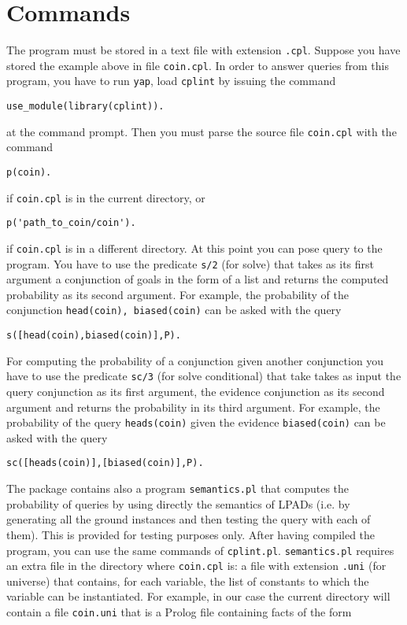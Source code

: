 \documentclass{article}
\begin{document}
\section{Commands}
The program must be stored in a text file with extension \texttt{.cpl}. Suppose you have stored the example above in file \texttt{coin.cpl}. 
In order to answer queries from this program, you have to run \texttt{yap},
load \texttt{cplint} by issuing the command
\begin{verbatim}
use_module(library(cplint)).
\end{verbatim}
at the command prompt.
Then you must parse the source file \texttt{coin.cpl}  with the command
\begin{verbatim}
p(coin).
\end{verbatim}
if \texttt{coin.cpl} is in the current directory, or 
\begin{verbatim}
p('path_to_coin/coin').
\end{verbatim}
if \texttt{coin.cpl} is in a different directory.
At this point you can pose query to the program. You have to use the predicate \texttt{s/2} (for solve) that takes as its first argument a conjunction of goals in the form of a list and returns the computed probability as its second argument. For example, the probability of the conjunction \texttt{head(coin), biased(coin)} can be asked with the query
\begin{verbatim}
s([head(coin),biased(coin)],P).
\end{verbatim}
For computing the probability of a conjunction given another conjunction you have to use the predicate \texttt{sc/3} (for solve conditional) that take takes as input the query conjunction as its first argument, the evidence conjunction as its second argument and returns the probability in its third argument.
For example, the probability of  the query \texttt{heads(coin)} given the evidence \texttt{biased(coin)} can be asked with the query
\begin{verbatim}
sc([heads(coin)],[biased(coin)],P).
\end{verbatim}
The package contains also a program \texttt{semantics.pl} that computes the probability of queries by using directly the semantics of LPADs (i.e. by generating all the ground instances and then testing the query with each of them). This is provided for testing purposes only.  After having compiled the program, you can use the same commands of \texttt{cplint.pl}. \texttt{semantics.pl} requires an extra file in the directory where \texttt{coin.cpl} is: a file with extension \texttt{.uni} (for universe) that contains, for each variable, the list of constants to which the variable can be instantiated. For example, in our case the current directory will contain a file \texttt{coin.uni} that is a Prolog file containing facts of the form
\end{document}
